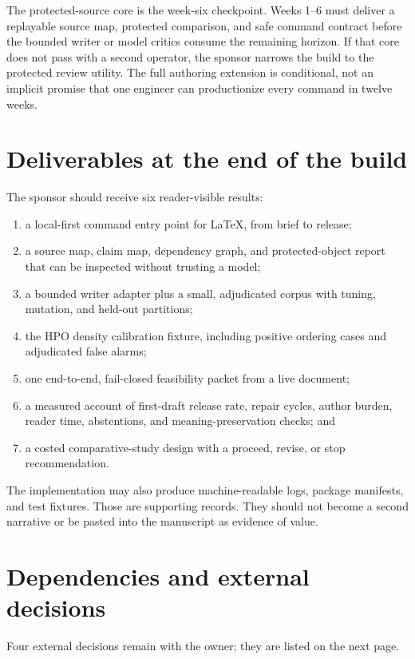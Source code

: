 The protected-source core is the week-six checkpoint. Weeks 1--6 must deliver a
replayable source map, protected comparison, and safe command contract before the
bounded writer or model critics consume the remaining horizon. If that core does
not pass with a second operator, the sponsor narrows the build to the protected
review utility. The full authoring extension is conditional, not an implicit
promise that one engineer can productionize every command in twelve weeks.

\section{Deliverables at the end of the build}

The sponsor should receive six reader-visible results:

\begin{enumerate}
\item a local-first command entry point for LaTeX, from brief to release;
\item a source map, claim map, dependency graph, and protected-object report
      that can be inspected without trusting a model;
\item a bounded writer adapter plus a small, adjudicated corpus with tuning,
      mutation, and held-out partitions;
\item the HPO density calibration fixture, including positive ordering cases
      and adjudicated false alarms;
\item one end-to-end, fail-closed feasibility packet from a live document;
\item a measured account of first-draft release rate, repair cycles, author
      burden, reader time, abstentions, and meaning-preservation checks; and
\item a costed comparative-study design with a proceed, revise, or stop
      recommendation.
\end{enumerate}

The implementation may also produce machine-readable logs, package manifests,
and test fixtures. Those are supporting records. They should not become a
second narrative or be pasted into the manuscript as evidence of value.

\section{Dependencies and external decisions}

Four external decisions remain with the owner; they are listed on the next
page.

